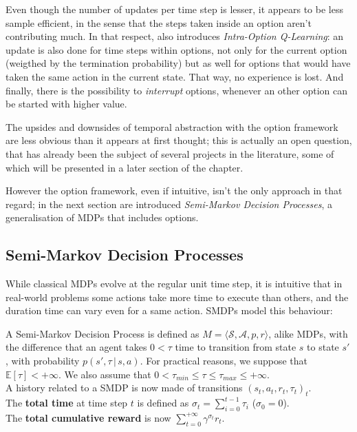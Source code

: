Even though the number of updates per time step is lesser, it appears to be less sample efficient, in the sense that the steps taken inside an option aren't contributing much. In that respect, \citep{sutton_between_1999} also introduces \emph{Intra-Option Q-Learning}: an update is also done for time steps within options, not only for the current option (weigthed by the termination probability) but as well for options that would have taken the same action in the current state. That way, no experience is lost. And finally, there is the possibility to \emph{interrupt} options, whenever an other option can be started with higher value.

The upsides and downsides of temporal abstraction with the option framework are less obvious than it appears at first thought; this is actually an open question, that has already been the subject of several projects in the literature, some of which will be presented in a later section of the chapter.

However the option framework, even if intuitive, isn't the only approach in that regard; in the next section are introduced \emph{Semi-Markov Decision Processes}, a generalisation of MDPs that includes options.

\subsection{Semi-Markov Decision Processes}
\label{subsec:SMDP}

While classical MDPs evolve at the regular unit time step, it is intuitive that in real-world problems some actions take more time to execute than others, and the duration time can vary even for a same action. SMDPs model this behaviour:

\begin{defi}
  A Semi-Markov Decision Process is defined as $M = \langle \mathcal{S}, \mathcal{A}, p, r \rangle$, alike MDPs, with the difference that an agent takes $0<\tau$ time to transition from state $s$ to state $s'$, with probability $p(s', \tau \,|\, s,a)$. For practical reasons, we suppose that $\mathbb{E} \left[\tau \right] < +\infty$. We also assume that $0 < \tau_{min} \leq \tau \leq \tau_{max} \leq +\infty$.\\
  A history related to a SMDP is now made of transitions $\left( s_t, a_t, r_t, \tau_t \right)_t$.\\
  The \textbf{total time} at time step $t$ is defined as $\sigma_t = \sum_{i=0}^{t-1} \tau_i$ ($\sigma_0 = 0$).\\
  The \textbf{total cumulative reward} is now $\sum_{t = 0}^{+ \infty} \gamma^{\sigma_t} r_t$.
\end{defi}

